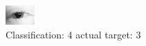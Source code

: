 \begin{figure}[h!]
\begin{center}
\includegraphics[width=0.60\columnwidth]{figures/ID75_class_4_target_3.png}
\end{center}
\caption{ Classification: 4 actual target: 3}
\label{fig:ID75_class_4_target_3}
\end{figure}

